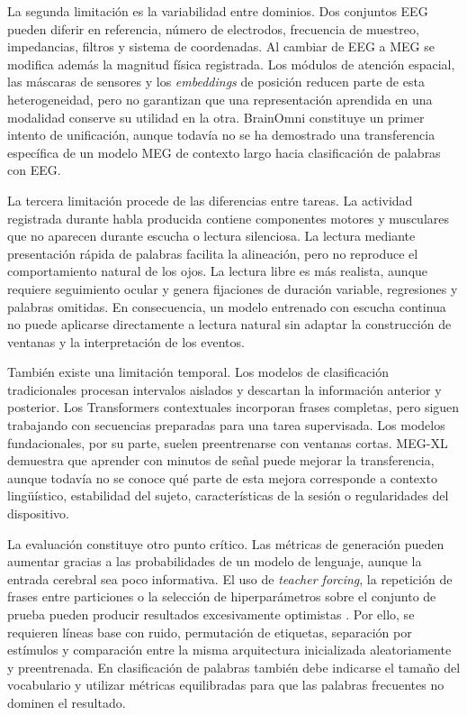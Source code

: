 La segunda limitación es la variabilidad entre dominios. Dos conjuntos EEG pueden diferir en referencia, número de electrodos, frecuencia de muestreo, impedancias, filtros y sistema de coordenadas. Al cambiar de EEG a MEG se modifica además la magnitud física registrada. Los módulos de atención espacial, las máscaras de sensores y los \textit{embeddings} de posición reducen parte de esta heterogeneidad, pero no garantizan que una representación aprendida en una modalidad conserve su utilidad en la otra. BrainOmni constituye un primer intento de unificación, aunque todavía no se ha demostrado una transferencia específica de un modelo MEG de contexto largo hacia clasificación de palabras con EEG.

La tercera limitación procede de las diferencias entre tareas. La actividad registrada durante habla producida contiene componentes motores y musculares que no aparecen durante escucha o lectura silenciosa. La lectura mediante presentación rápida de palabras facilita la alineación, pero no reproduce el comportamiento natural de los ojos. La lectura libre es más realista, aunque requiere seguimiento ocular y genera fijaciones de duración variable, regresiones y palabras omitidas. En consecuencia, un modelo entrenado con escucha continua no puede aplicarse directamente a lectura natural sin adaptar la construcción de ventanas y la interpretación de los eventos.

También existe una limitación temporal. Los modelos de clasificación tradicionales procesan intervalos aislados y descartan la información anterior y posterior. Los Transformers contextuales incorporan frases completas, pero siguen trabajando con secuencias preparadas para una tarea supervisada. Los modelos fundacionales, por su parte, suelen preentrenarse con ventanas cortas. MEG-XL demuestra que aprender con minutos de señal puede mejorar la transferencia, aunque todavía no se conoce qué parte de esta mejora corresponde a contexto lingüístico, estabilidad del sujeto, características de la sesión o regularidades del dispositivo.

La evaluación constituye otro punto crítico. Las métricas de generación pueden aumentar gracias a las probabilidades de un modelo de lenguaje, aunque la entrada cerebral sea poco informativa. El uso de \textit{teacher forcing}, la repetición de frases entre particiones o la selección de hiperparámetros sobre el conjunto de prueba pueden producir resultados excesivamente optimistas \cite{jo2024eegtext}. Por ello, se requieren líneas base con ruido, permutación de etiquetas, separación por estímulos y comparación entre la misma arquitectura inicializada aleatoriamente y preentrenada. En clasificación de palabras también debe indicarse el tamaño del vocabulario y utilizar métricas equilibradas para que las palabras frecuentes no dominen el resultado.

